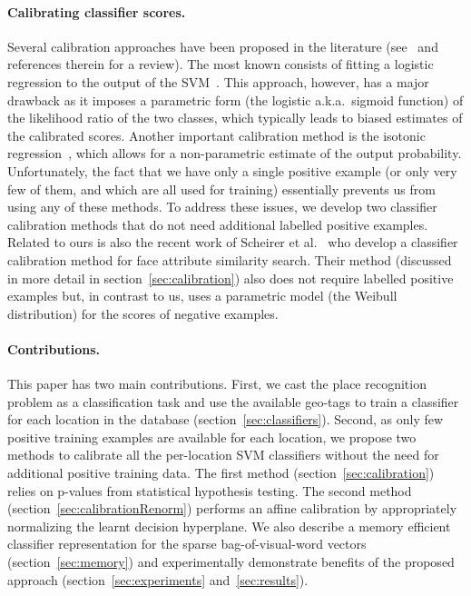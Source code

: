 \paragraph{Calibrating classifier scores.} 
  Several calibration approaches have been proposed in the literature (see~\cite{gebel2007calibrating} and references therein for a review). The most known consists of fitting a logistic regression to the output of the SVM~\cite{Platt99}.  This approach, however, has a major drawback as it imposes a parametric form (the logistic a.k.a.\ sigmoid function) of the likelihood ratio of the two classes, which typically leads to biased estimates of the calibrated scores. Another important calibration method is the isotonic regression~\cite{zadrozny2002transforming}, which allows for a non-parametric estimate of the output probability.
  Unfortunately, the fact that we have only a single positive example (or only very few of them, and which are all used for training) essentially prevents us from using any of these methods. 
  To address these issues, we develop two classifier calibration methods that do not need additional labelled positive examples. Related to ours is also the recent work of Scheirer et al.~\cite{Scheirer12} who develop a classifier calibration method for face attribute similarity search. Their method (discussed in more detail in section~\ref{sec:calibration}) also does not require labelled positive examples but, in contrast to us, uses a parametric model (the Weibull distribution) for the scores of negative examples.    


\paragraph{Contributions.} 
  This paper has two main contributions. First, we cast the place recognition problem as a classification task and use the available geo-tags to train a classifier for each location in the database (section~\ref{sec:classifiers}). Second, as only few positive training examples are available for each location, we propose two methods to calibrate all the per-location SVM classifiers without the need for additional positive training data. The first method (section~\ref{sec:calibration}) relies on p-values from statistical hypothesis testing. The second method (section~\ref{sec:calibrationRenorm}) performs an affine calibration by appropriately normalizing the learnt decision hyperplane. 
  We also describe a memory efficient classifier representation for the sparse bag-of-visual-word vectors (section~\ref{sec:memory}) and  experimentally demonstrate benefits of the proposed approach (section~\ref{sec:experiments} and~\ref{sec:results}). 


